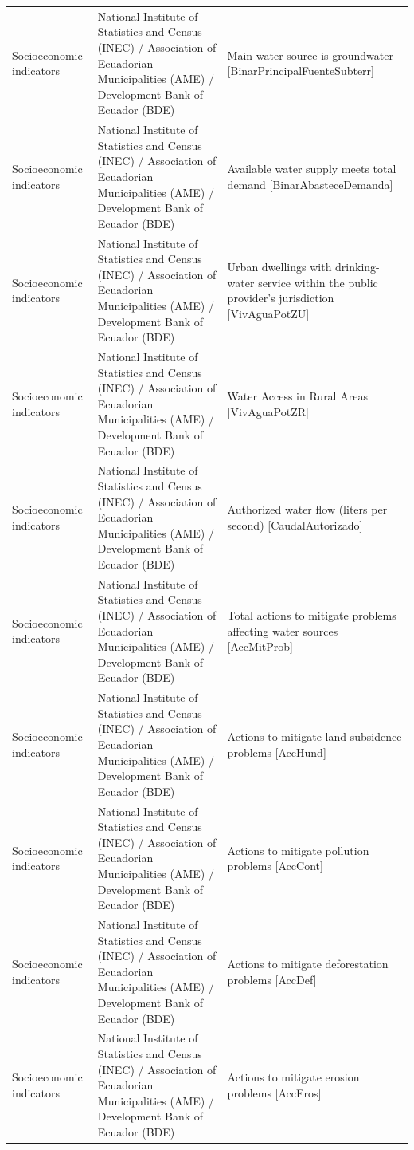 \documentclass[10pt,a4paper]{article}
\begin{document}
\begin{longtable}{@{}>{\raggedright\arraybackslash}p{3.5cm}>{\raggedright\arraybackslash}p{5.6cm}>{\raggedright\arraybackslash}p{\dimexpr\textwidth-9.1cm-4\tabcolsep\relax}@{}}
Socioeconomic indicators & National Institute of Statistics and Census (INEC) / Association of Ecuadorian Municipalities (AME) / Development Bank of Ecuador (BDE) & Main water source is groundwater [BinarPrincipalFuenteSubterr]\\
Socioeconomic indicators & National Institute of Statistics and Census (INEC) / Association of Ecuadorian Municipalities (AME) / Development Bank of Ecuador (BDE) & Available water supply meets total demand [BinarAbasteceDemanda]\\
Socioeconomic indicators & National Institute of Statistics and Census (INEC) / Association of Ecuadorian Municipalities (AME) / Development Bank of Ecuador (BDE) & Urban dwellings with drinking-water service within the public provider's jurisdiction [VivAguaPotZU]\\
Socioeconomic indicators & National Institute of Statistics and Census (INEC) / Association of Ecuadorian Municipalities (AME) / Development Bank of Ecuador (BDE) & Water Access in Rural Areas [VivAguaPotZR]\\
Socioeconomic indicators & National Institute of Statistics and Census (INEC) / Association of Ecuadorian Municipalities (AME) / Development Bank of Ecuador (BDE) & Authorized water flow (liters per second) [CaudalAutorizado]\\
Socioeconomic indicators & National Institute of Statistics and Census (INEC) / Association of Ecuadorian Municipalities (AME) / Development Bank of Ecuador (BDE) & Total actions to mitigate problems affecting water sources [AccMitProb]\\
Socioeconomic indicators & National Institute of Statistics and Census (INEC) / Association of Ecuadorian Municipalities (AME) / Development Bank of Ecuador (BDE) & Actions to mitigate land-subsidence problems [AccHund]\\
Socioeconomic indicators & National Institute of Statistics and Census (INEC) / Association of Ecuadorian Municipalities (AME) / Development Bank of Ecuador (BDE) & Actions to mitigate pollution problems [AccCont]\\
Socioeconomic indicators & National Institute of Statistics and Census (INEC) / Association of Ecuadorian Municipalities (AME) / Development Bank of Ecuador (BDE) & Actions to mitigate deforestation problems [AccDef]\\
Socioeconomic indicators & National Institute of Statistics and Census (INEC) / Association of Ecuadorian Municipalities (AME) / Development Bank of Ecuador (BDE) & Actions to mitigate erosion problems [AccEros]\\

\end{longtable}
\end{document}
